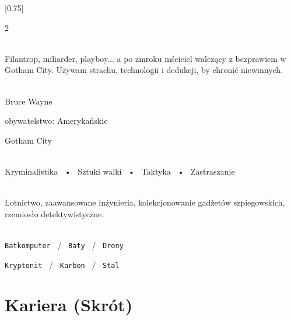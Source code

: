 \documentclass[darkhipster]{simplehipstercv}
\begin{document}
\setlength{\columnsep}{1.5cm}
[0.75]
\begin{paracol}{2}

\paracolbackgroundoptions

\footnotesize
{\setasidefontcolour
\flushright
\begin{center}
\end{center}

\\[0.5em]

{\footnotesize Filantrop, miliarder, playboy... a po zmroku mściciel walczący z bezprawiem w Gotham City. Używam strachu, technologii i dedukcji, by chronić niewinnych.}
\bigskip

 \\[0.5em]
Bruce Wayne

obywatelstwo: Amerykańskie 

Gotham City

\bigskip

 \\[0.5em]

Kryminalistika ~•~ Sztuki walki ~•~ Taktyka ~•~ Zastraszanie

\bigskip

\\[0.5em]

Lotnictwo, zaawansowane inżynieria, kolekcjonowanie gadżetów szpiegowskich, rzemiosło detektywistyczne.
\bigskip

\ \\[0.5em]

\texttt{Batkomputer} ~/~ \texttt{Baty} ~/~ \texttt{Drony}

\texttt{Kryptonit} ~/~ \texttt{Karbon} ~/~ \texttt{Stal}

\vspace{4em}


\phantom{turn the page}

\phantom{turn the page}
}
\switchcolumn

\small
\section*{Kariera (Skrót)}


\end{paracol}
\end{document}
